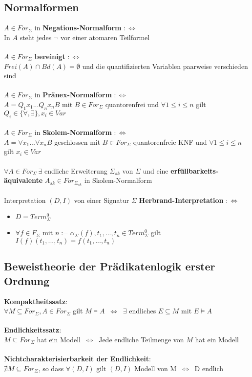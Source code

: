 \documentclass[a4paper,11pt]{scrartcl}
\newcommand{\tbf}{\textbf}
\newcommand{\Lra}{\Leftrightarrow}
\newcommand{\fol}{\vDash}
\newcommand{\Funk}{F_\Sigma}
\newcommand{\stell}{\alpha_\Sigma}
\newcommand{\Term}{Term_\Sigma}
\newcommand{\For}{For_\Sigma}
\theoremstyle{default}
\begin{document}
\subsection{Normalformen}
$A \in \For$ in \tbf{Negations-Normalform} $:\Lra$ \\
In $A$ steht jedes $\neg$ vor einer atomaren Teilformel \\
\ \\ $A \in \For$ \tbf{bereinigt} $:\Lra$ \\
$Frei(A) \cap Bd(A) = \emptyset$ und die quantifizierten Variablen paarweise verschieden sind \\
\ \\ $A \in \For$ in \tbf{Pränex-Normalform} $:\Lra$ \\
$A = Q_1 x_1 ... Q_n x_n B$ mit $B \in \For$ quantorenfrei und $\forall 1 \leq i \leq n$ gilt $Q_i \in \{\forall, \exists \}, x_i \in Var$ \\
\ \\ $A \in \For$ in \tbf{Skolem-Normalform} $:\Lra$ \\
$A = \forall x_1 ... \forall x_n B$ geschlossen mit $B \in \For$ quantorenfreie KNF und $\forall 1 \leq i \leq n$ gilt $x_i \in Var$ \\
\ \\ $\forall A \in \For \ \exists$ endliche Erweiterung $\Sigma_{sk}$ von $\Sigma$ und eine \tbf{erfüllbarkeits-äquivalente} $A_{sk} \in For_{\Sigma_{sk}}$ in Skolem-Normalform \\
\ \\ Interpretation $(D, I)$ von einer Signatur $\Sigma$ \tbf{Herbrand-Interpretation} $:\Lra$
\begin{itemize}
 \item $D = \Term^0$
 \item $\forall f \in \Funk$ mit $n := \stell(f), t_1, ..., t_n \in \Term^0$ gilt $I(f)(t_1, ..., t_n) = f(t_1, ...,t_n)$
\end{itemize}

\subsection{Beweistheorie der Prädikatenlogik erster Ordnung}
\tbf{Kompaktheitssatz}: \\
$\forall M \subseteq \For, A \in \For$ gilt $M \fol A$ $\ \Lra \ $ $\exists$ endliches $E \subseteq M$ mit $E \fol A$ \\
\ \\ \tbf{Endlichkeitssatz}: \\
$M \subseteq \For$ hat ein Modell $\ \Lra \ $ Jede endliche Teilmenge von $M$ hat ein Modell \\
\ \\ \tbf{Nichtcharakterisierbarkeit der Endlichkeit}: \\
$\nexists M \subseteq \For$, so dass $\forall (D, I)$ gilt $(D, I)$ Modell von M $\ \Lra \ $ D endlich \\
\end{document}
